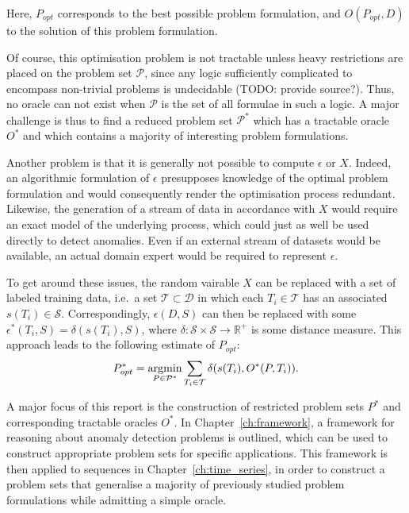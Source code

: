 Here, $P_{opt}$ corresponds to the best possible problem formulation, and $O(P_{opt}, D)$ to the solution of this problem formulation.

Of course, this optimisation problem is not tractable unless heavy restrictions are placed on the problem set $\mathcal{P}$, since any logic sufficiently complicated to encompass non-trivial problems is undecidable (TODO: provide source?). Thus, no oracle can not exist when $\mathcal{P}$ is the set of all formulae in such a logic. A major challenge is thus to find a reduced problem set $\mathcal{P}^*$ which has a tractable oracle $O^*$ and which contains a majority of interesting problem formulations.

Another problem is that it is generally not possible to compute $\epsilon$ or $X$. Indeed, an algorithmic formulation of $\epsilon$ presupposes knowledge of the optimal problem formulation and would consequently render the optimisation process redundant. Likewise, the generation of a stream of data in accordance with $X$ would require an exact model of the underlying process, which could just as well be used directly to detect anomalies. Even if an external stream of datasets would be available, an actual domain expert would be required to represent $\epsilon$.

To get around these issues, the random vairable $X$ can be replaced with a set of labeled training data, i.e.\ a set $\mathcal{T} \subset \mathcal{D}$ in which each $T_i \in \mathcal{T}$ has an associated $s(T_i) \in \mathcal{S}$.
Correspondingly, $\epsilon(D, S)$ can then be replaced with some $\epsilon^*(T_i, S) = \delta(s(T_i), S)$, where $\delta: \mathcal{S} \times \mathcal{S} \rightarrow \mathbb{R}^+$ is some distance measure.
This approach leads to the following estimate of $P_{opt}$:
\[
    P^*_{opt} = \argmin_{P \in \mathcal{P}^*} \sum_{T_i \in \mathcal{T}} \delta(s(T_i), O^*(P, T_i)).
\]

A major focus of this report is the construction of restricted problem sets $P^*$ and corresponding tractable oracles $O^*$. In Chapter~\ref{ch:framework}, a framework for reasoning about anomaly detection problems is outlined, which can be used to construct appropriate problem sets for specific applications. This framework is then applied to sequences in Chapter~\ref{ch:time_series}, in order to construct a problem sets that generalise a majority of previously studied problem formulations while admitting a simple oracle.
